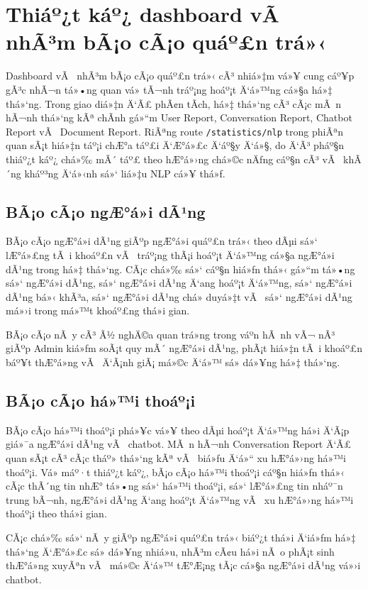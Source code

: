 ﻿\documentclass[12pt,a4paper]{report}
\begin{document}
\section{Thiáº¿t káº¿ dashboard vÃ  nhÃ³m bÃ¡o cÃ¡o quáº£n trá»‹}

Dashboard vÃ  nhÃ³m bÃ¡o cÃ¡o quáº£n trá»‹ cÃ³ nhiá»‡m vá»¥ cung cáº¥p gÃ³c nhÃ¬n tá»•ng quan vá» tÃ¬nh tráº¡ng hoáº¡t Ä‘á»™ng cá»§a há»‡ thá»‘ng. Trong giao diá»‡n Ä‘Ã£ phÃ¢n tÃ­ch, há»‡ thá»‘ng cÃ³ cÃ¡c mÃ n hÃ¬nh thá»‘ng kÃª chÃ­nh gá»“m User Report, Conversation Report, Chatbot Report vÃ  Document Report. RiÃªng route \texttt{/statistics/nlp} trong phiÃªn quan sÃ¡t hiá»‡n táº¡i chÆ°a táº£i Ä‘Æ°á»£c Ä‘áº§y Ä‘á»§, do Ä‘Ã³ pháº§n thiáº¿t káº¿ chá»‰ mÃ´ táº£ theo hÆ°á»›ng chá»©c nÄƒng cáº§n cÃ³ vÃ  khÃ´ng kháº³ng Ä‘á»‹nh sá»‘ liá»‡u NLP cá»¥ thá»ƒ.

\subsection{BÃ¡o cÃ¡o ngÆ°á»i dÃ¹ng}

BÃ¡o cÃ¡o ngÆ°á»i dÃ¹ng giÃºp ngÆ°á»i quáº£n trá»‹ theo dÃµi sá»‘ lÆ°á»£ng tÃ i khoáº£n vÃ  tráº¡ng thÃ¡i hoáº¡t Ä‘á»™ng cá»§a ngÆ°á»i dÃ¹ng trong há»‡ thá»‘ng. CÃ¡c chá»‰ sá»‘ cáº§n hiá»ƒn thá»‹ gá»“m tá»•ng sá»‘ ngÆ°á»i dÃ¹ng, sá»‘ ngÆ°á»i dÃ¹ng Ä‘ang hoáº¡t Ä‘á»™ng, sá»‘ ngÆ°á»i dÃ¹ng bá»‹ khÃ³a, sá»‘ ngÆ°á»i dÃ¹ng chá» duyá»‡t vÃ  sá»‘ ngÆ°á»i dÃ¹ng má»›i trong má»™t khoáº£ng thá»i gian.

BÃ¡o cÃ¡o nÃ y cÃ³ Ã½ nghÄ©a quan trá»ng trong váº­n hÃ nh vÃ¬ nÃ³ giÃºp Admin kiá»ƒm soÃ¡t quy mÃ´ ngÆ°á»i dÃ¹ng, phÃ¡t hiá»‡n tÃ i khoáº£n báº¥t thÆ°á»ng vÃ  Ä‘Ã¡nh giÃ¡ má»©c Ä‘á»™ sá»­ dá»¥ng há»‡ thá»‘ng.

\subsection{BÃ¡o cÃ¡o há»™i thoáº¡i}

BÃ¡o cÃ¡o há»™i thoáº¡i phá»¥c vá»¥ theo dÃµi hoáº¡t Ä‘á»™ng há»i Ä‘Ã¡p giá»¯a ngÆ°á»i dÃ¹ng vÃ  chatbot. MÃ n hÃ¬nh Conversation Report Ä‘Ã£ quan sÃ¡t cÃ³ cÃ¡c tháº» thá»‘ng kÃª vÃ  biá»ƒu Ä‘á»“ xu hÆ°á»›ng há»™i thoáº¡i. Vá» máº·t thiáº¿t káº¿, bÃ¡o cÃ¡o há»™i thoáº¡i cáº§n hiá»ƒn thá»‹ cÃ¡c thÃ´ng tin nhÆ° tá»•ng sá»‘ há»™i thoáº¡i, sá»‘ lÆ°á»£ng tin nháº¯n trung bÃ¬nh, ngÆ°á»i dÃ¹ng Ä‘ang hoáº¡t Ä‘á»™ng vÃ  xu hÆ°á»›ng há»™i thoáº¡i theo thá»i gian.

CÃ¡c chá»‰ sá»‘ nÃ y giÃºp ngÆ°á»i quáº£n trá»‹ biáº¿t thá»i Ä‘iá»ƒm há»‡ thá»‘ng Ä‘Æ°á»£c sá»­ dá»¥ng nhiá»u, nhÃ³m cÃ¢u há»i nÃ o phÃ¡t sinh thÆ°á»ng xuyÃªn vÃ  má»©c Ä‘á»™ tÆ°Æ¡ng tÃ¡c cá»§a ngÆ°á»i dÃ¹ng vá»›i chatbot.
\end{document}
